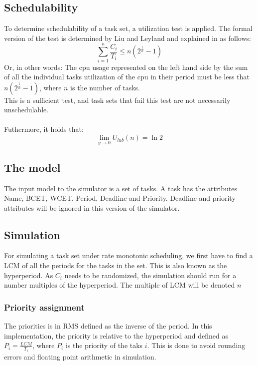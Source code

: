 \documentclass{acm_proc_article-sp}
\begin{document}
\subsection{Schedulability}
To determine schedulability of a task set, a utilization test is applied. The formal version of the test is determined by Liu and Leyland and explained in \cite{CoDeKaMa2002} as follows:
\begin{equation}
\displaystyle\sum\limits_{i=1}^{n} \frac{C_i}{T_i} \leq n \left( 2^{\frac{1}{n}} - 1 \right) 
\end{equation}
Or, in other words: The cpu usage represented on the left hand side by the sum of all the individual tasks utilization of the cpu in their period must be less that $n \left( 2^{\frac{1}{n}} - 1 \right) $, where $n$ is the number of tasks.\\
This is a sufficient test, and task sets that fail this test are not necessarily unschedulable.\\\\
Futhermore, it holds that:
\begin{equation}
\underset{y\rightarrow0}{\lim}U_{lub}(n)=\ln2
\end{equation}

\subsection{The model}
The input model to the simulator is a set of tasks. A task has the attributes Name, BCET, WCET, Period, Deadline and Priority. Deadline and priority attributes will be ignored in this version of the simulator.

\subsection{Simulation}
For simulating a task set under rate monotonic scheduling, we first have to find a LCM of all the periods for the tasks in the set. This is also known as the hyperperiod. As $C_i$ needs to be randomized, the simulation should run for a number multiples of the hyperperiod. The multiple of LCM will be denoted $n$
\subsubsection*{Priority assignment}
The priorities is in RMS defined as the inverse of the period. In this implementation, the priority is relative to the hyperperiod and defined as $P_i = \frac{LCM}{T_i}$, where $P_i$ is the priority of the taks $i$. This is done to avoid rounding errors and floating point arithmetic in simulation.
\end{document}
